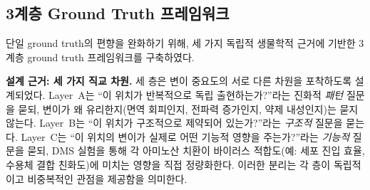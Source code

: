 \begin{table}[htbp]
\centering
\caption{9종 병원체별 서열 데이터셋 특성}
\label{tab:pathogen_data}
\footnotesize
{}
\end{table}

\subsection{3계층 Ground Truth 프레임워크}
\label{subsec:3layer_gt}

단일 ground truth의 편향을 완화하기 위해, 세 가지 독립적 생물학적 근거에 기반한 3계층 ground truth 프레임워크를 구축하였다.

\textbf{설계 근거: 세 가지 직교 차원.}
세 층은 변이 중요도의 서로 다른 차원을 포착하도록 설계되었다.
Layer~A는 ``이 위치가 반복적으로 독립 출현하는가?''라는 진화적 \textit{패턴} 질문을 묻되, 변이가 왜 유리한지(면역 회피인지, 전파력 증가인지, 약제 내성인지)는 묻지 않는다.
Layer~B는 ``이 위치가 구조적으로 제약되어 있는가?''라는 \textit{구조적} 질문을 묻는다.
Layer~C는 ``이 위치의 변이가 실제로 어떤 기능적 영향을 주는가?''라는 \textit{기능적} 질문을 묻되, DMS 실험을 통해 각 아미노산 치환이 바이러스 적합도(예: 세포 진입 효율, 수용체 결합 친화도)에 미치는 영향을 직접 정량화한다.
이러한 분리는 각 층이 독립적이고 비중복적인 관점을 제공함을 의미한다.

